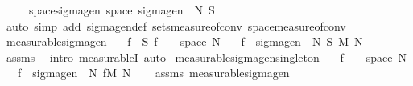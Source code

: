 \begin{isabellebody}
\ \ \ \ \ space{\isacharunderscore}{\kern0pt}sigma{\isacharunderscore}{\kern0pt}gen{\isacharcolon}{\kern0pt}\ {\isachardoublequoteopen}space\ {\isacharparenleft}{\kern0pt}sigma{\isacharunderscore}{\kern0pt}gen\ {\isasymOmega}\ N\ S{\isacharparenright}{\kern0pt}\ {\isacharequal}{\kern0pt}\ {\isasymOmega}{\isachardoublequoteclose}\isanewline
%
\isadelimproof
\ \ %
\endisadelimproof
%
\isatagproof
{}\isamarkupfalse%
\ {\isacharparenleft}{\kern0pt}auto\ simp\ add{\isacharcolon}{\kern0pt}\ sigma{\isacharunderscore}{\kern0pt}gen{\isacharunderscore}{\kern0pt}def\ sets{\isacharunderscore}{\kern0pt}measure{\isacharunderscore}{\kern0pt}of{\isacharunderscore}{\kern0pt}conv\ space{\isacharunderscore}{\kern0pt}measure{\isacharunderscore}{\kern0pt}of{\isacharunderscore}{\kern0pt}conv{\isacharparenright}{\kern0pt}%
\endisatagproof
{\isafoldproof}%
%
\isadelimproof
\isanewline
%
\endisadelimproof
\isanewline
{}\isamarkupfalse%
\ measurable{\isacharunderscore}{\kern0pt}sigma{\isacharunderscore}{\kern0pt}gen{\isacharcolon}{\kern0pt}\isanewline
\ \ \ {\isachardoublequoteopen}f\ {\isasymin}\ S{\isachardoublequoteclose}\ {\isachardoublequoteopen}f\ {\isasymin}\ {\isasymOmega}\ {\isasymrightarrow}\ space\ N{\isachardoublequoteclose}\isanewline
\ \ \ {\isachardoublequoteopen}f\ {\isasymin}\ sigma{\isacharunderscore}{\kern0pt}gen\ {\isasymOmega}\ N\ S\ {\isasymrightarrow}\isactrlsub M\ N{\isachardoublequoteclose}\isanewline
%
\isadelimproof
\ \ %
\endisadelimproof
%
\isatagproof
{}\isamarkupfalse%
\ assms\ \isamarkupfalse%
\ {\isacharparenleft}{\kern0pt}intro\ measurableI{\isacharcomma}{\kern0pt}\ auto{\isacharparenright}{\kern0pt}%
\endisatagproof
{\isafoldproof}%
%
\isadelimproof
\isanewline
%
\endisadelimproof
\isanewline
{}\isamarkupfalse%
\ measurable{\isacharunderscore}{\kern0pt}sigma{\isacharunderscore}{\kern0pt}gen{\isacharunderscore}{\kern0pt}singleton{\isacharcolon}{\kern0pt}\isanewline
\ \ \ {\isachardoublequoteopen}f\ {\isasymin}\ {\isasymOmega}\ {\isasymrightarrow}\ space\ N{\isachardoublequoteclose}\isanewline
\ \ \ {\isachardoublequoteopen}f\ {\isasymin}\ sigma{\isacharunderscore}{\kern0pt}gen\ {\isasymOmega}\ N\ {\isacharbraceleft}{\kern0pt}f{\isacharbraceright}{\kern0pt}{\isasymrightarrow}\isactrlsub M\ N{\isachardoublequoteclose}\isanewline
%
\isadelimproof
\ \ %
\endisadelimproof
%
\isatagproof
{}\isamarkupfalse%
\ assms\ measurable{\isacharunderscore}{\kern0pt}sigma{\isacharunderscore}{\kern0pt}gen\ \isamarkupfalse%

\end{isabellebody}
